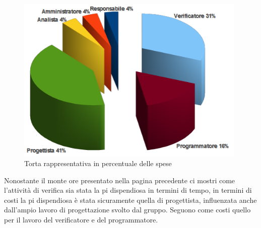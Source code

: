 \vspace{0cm}
\begin{figure}[htbp!]
  \centering
  \includegraphics[width=11cm, angle=0]{img/PP/SPESE-FINE.png}
\caption{Torta rappresentativa in percentuale delle spese}
\end{figure}
\vspace{0.5cm}


Nonostante il monte ore presentato nella pagina precedente ci mostri come
l'attivit\`a di verifica sia stata la pi dispendiosa in termini di tempo, in
termini di costi la pi dispendiosa \`e stata sicuramente quella di progettista,
influenzata anche dall'ampio lavoro di progettazione svolto dal gruppo.
Seguono come costi quello per il lavoro del verificatore e del programmatore.

\listoftables
{}
\listoffigures
{}

